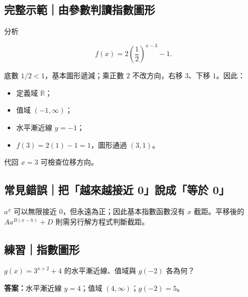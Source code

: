 \documentclass[11pt,a4paper]{article}
\providecommand{\tightlist}{%
  \setlength{\itemsep}{0pt}\setlength{\parskip}{0pt}}
\begin{document}
\begin{HandoutWorkedExample}

\subsection{完整示範｜由參數判讀指數圖形}\label{ux5b8cux6574ux793aux7bc4ux7531ux53c3ux6578ux5224ux8b80ux6307ux6578ux5716ux5f62}

分析

\[
f(x)=2\left(\frac12\right)^{x-3}-1.
\]

底數 \(1/2<1\)，基本圖形遞減；乘正數 \(2\) 不改方向，右移 \(3\)、下移 \(1\)。因此：

\begin{itemize}
\tightlist
\item
  定義域 \(\mathbb R\)；
\item
  值域 \((-1,\infty)\)；
\item
  水平漸近線 \(y=-1\)；
\item
  \(f(3)=2(1)-1=1\)，圖形通過 \((3,1)\)。
\end{itemize}

代回 \(x=3\) 可檢查位移方向。

\end{HandoutWorkedExample}

\subsection{常見錯誤｜把「越來越接近 0」說成「等於 0」}\label{ux5e38ux898bux932fux8aa4ux628aux8d8aux4f86ux8d8aux63a5ux8fd1-0ux8aaaux6210ux7b49ux65bc-0}

\(a^x\) 可以無限接近 \(0\)，但永遠為正；因此基本指數函數沒有 \(x\) 截距。平移後的 \(Aa^{B(x-h)}+D\) 則需另行解方程式判斷截距。

\begin{HandoutSelfCheck}

\subsection{練習｜指數圖形}\label{ux7df4ux7fd2ux6307ux6578ux5716ux5f62}

\(g(x)=3^{x+2}+4\) 的水平漸近線、值域與 \(g(-2)\) 各為何？

\textbf{答案：}水平漸近線 \(y=4\)；值域 \((4,\infty)\)；\(g(-2)=5\)。

\end{HandoutSelfCheck}
\end{document}

